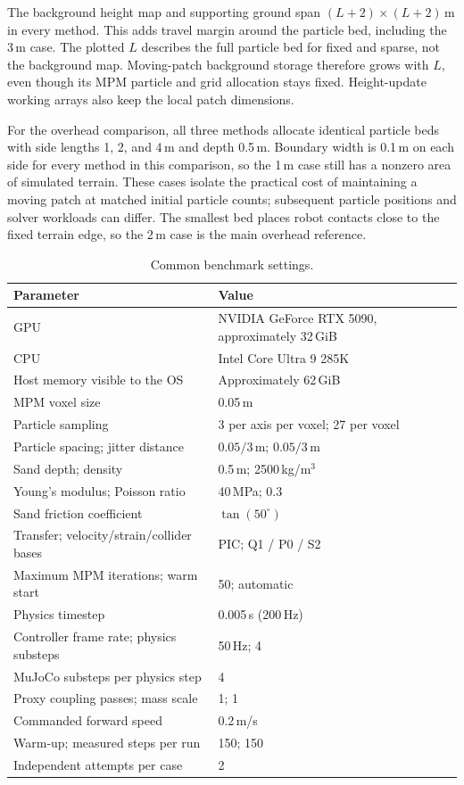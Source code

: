 \documentclass[10pt,a4paper]{article}
\begin{document}
The background height map and supporting ground span $(L+2)\times(L+2)$\,m in every method. This adds travel margin around the particle bed, including the 3\,m case. The plotted $L$ describes the full particle bed for fixed and sparse, not the background map. Moving-patch background storage therefore grows with $L$, even though its MPM particle and grid allocation stays fixed. Height-update working arrays also keep the local patch dimensions.

For the overhead comparison, all three methods allocate identical particle beds with side lengths 1, 2, and 4\,m and depth 0.5\,m. Boundary width is 0.1\,m on each side for every method in this comparison, so the 1\,m case still has a nonzero area of simulated terrain. These cases isolate the practical cost of maintaining a moving patch at matched initial particle counts; subsequent particle positions and solver workloads can differ. The smallest bed places robot contacts close to the fixed terrain edge, so the 2\,m case is the main overhead reference.

\begin{table}[htbp]
\centering
\caption{Common benchmark settings.}\label{tab:setup}
\begin{tabular}{ll}
\toprule
Parameter & Value \\
\midrule
GPU & NVIDIA GeForce RTX 5090, approximately 32\,GiB \\
CPU & Intel Core Ultra 9 285K \\
Host memory visible to the OS & Approximately 62\,GiB \\
MPM voxel size & 0.05\,m \\
Particle sampling & 3 per axis per voxel; 27 per voxel \\
Particle spacing; jitter distance & $0.05/3$\,m; $0.05/3$\,m \\
Sand depth; density & 0.5\,m; 2500\,kg/m$^3$ \\
Young's modulus; Poisson ratio & 40\,MPa; 0.3 \\
Sand friction coefficient & $\tan(50^\circ)$ \\
Transfer; velocity/strain/collider bases & PIC; Q1 / P0 / S2 \\
Maximum MPM iterations; warm start & 50; automatic \\
Physics timestep & 0.005\,s (200\,Hz) \\
Controller frame rate; physics substeps & 50\,Hz; 4 \\
MuJoCo substeps per physics step & 4 \\
Proxy coupling passes; mass scale & 1; 1 \\
Commanded forward speed & 0.2\,m/s \\
Warm-up; measured steps per run & 150; 150 \\
Independent attempts per case & 2 \\
\bottomrule
\end{tabular}
\end{table}
\end{document}
